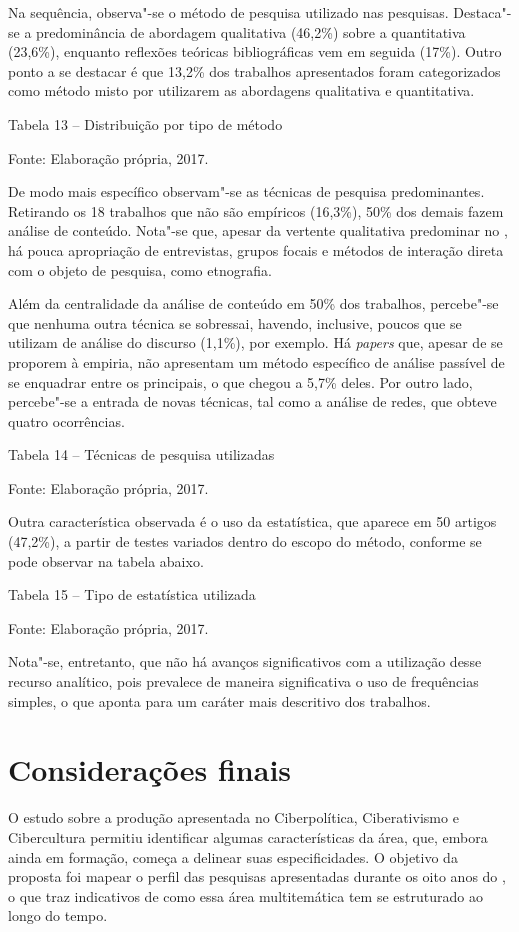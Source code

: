 Na sequência, observa"-se o método de pesquisa utilizado nas pesquisas.
Destaca"-se a predominância de abordagem qualitativa (46,2\%) sobre a
quantitativa (23,6\%), enquanto reflexões teóricas bibliográficas vem em
seguida (17\%). Outro ponto a se destacar é que 13,2\% dos trabalhos
apresentados foram categorizados como método misto por utilizarem as
abordagens qualitativa e quantitativa.

Tabela 13 -- Distribuição por tipo de método

Fonte: Elaboração própria, 2017.

De modo mais específico observam"-se as técnicas de pesquisa
predominantes. Retirando os 18 trabalhos que não são empíricos (16,3\%),
50\% dos demais fazem análise de conteúdo. Nota"-se que, apesar da
vertente qualitativa predominar no , há pouca apropriação de
entrevistas, grupos focais e métodos de interação direta com o objeto de
pesquisa, como etnografia.

Além da centralidade da análise de conteúdo em 50\% dos trabalhos,
percebe"-se que nenhuma outra técnica se sobressai, havendo, inclusive,
poucos que se utilizam de análise do discurso (1,1\%), por exemplo. Há
\emph{papers} que, apesar de se proporem à empiria, não apresentam um
método específico de análise passível de se enquadrar entre os
principais, o que chegou a 5,7\% deles. Por outro lado, percebe"-se a
entrada de novas técnicas, tal como a análise de redes, que obteve
quatro ocorrências.

Tabela 14 -- Técnicas de pesquisa utilizadas

Fonte: Elaboração própria, 2017.

Outra característica observada é o uso da estatística, que aparece em 50
artigos (47,2\%), a partir de testes variados dentro do escopo do
método, conforme se pode observar na tabela abaixo.

Tabela 15 -- Tipo de estatística utilizada

Fonte: Elaboração própria, 2017.

Nota"-se, entretanto, que não há avanços significativos com a utilização
desse recurso analítico, pois prevalece de maneira significativa o uso
de frequências simples, o que aponta para um caráter mais descritivo dos
trabalhos.

\section{Considerações finais}

O estudo sobre a produção apresentada no  Ciberpolítica, Ciberativismo
e Cibercultura permitiu identificar algumas características da área,
que, embora ainda em formação, começa a delinear suas especificidades. O
objetivo da proposta foi mapear o perfil das pesquisas apresentadas
durante os oito anos do , o que traz indicativos de como essa área
multitemática tem se estruturado ao longo do tempo.


